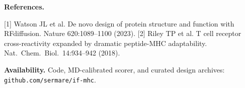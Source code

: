 \documentclass[11pt,twocolumn,letterpaper]{article}
\begin{document}
\vspace{3pt}
\noindent\textbf{References.}
{\footnotesize
[1] Watson JL et al. De novo design of protein structure and function with RFdiffusion. Nature
620:1089--1100 (2023).
[2] Riley TP et al. T cell receptor cross-reactivity expanded by dramatic peptide-MHC adaptability.
Nat.\ Chem.\ Biol.\ 14:934--942 (2018).
\par}

\vspace{2pt}
\noindent\textbf{Availability.}
Code, MD-calibrated scorer, and curated design archives: \texttt{github.com/sermare/if-mhc}.
\end{document}
